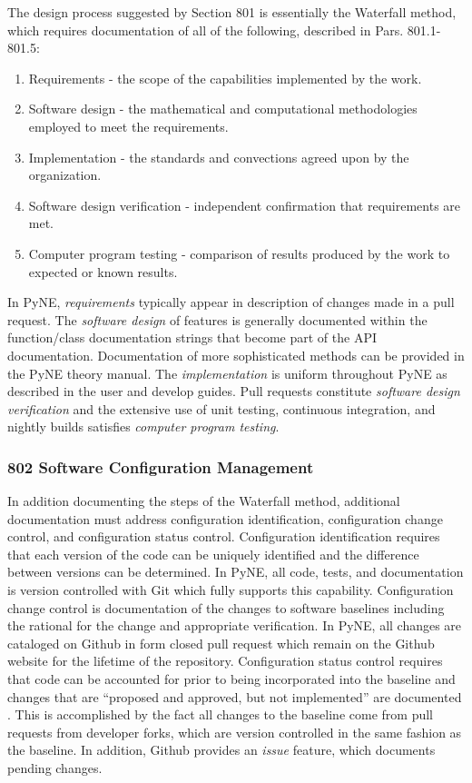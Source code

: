 \documentclass{anstrans}
\begin{document}
The design process suggested by Section 801 is essentially the Waterfall method, which requires documentation of all of the following, described in Pars. 801.1-801.5:

\begin{enumerate} 
\item{Requirements - the scope of the capabilities implemented by the work.}
\item{Software design - the mathematical and computational methodologies employed to meet the requirements.}
\item{Implementation - the standards and convections agreed upon by the organization.}
\item{Software design verification - independent confirmation that requirements are met.}
\item{Computer program testing - comparison of results produced by the work to expected or known results.}
\end{enumerate}

In PyNE, \emph{requirements} typically appear in description of changes made in
a pull request. The \emph{software design} of features is generally documented
within the function/class documentation strings that become part of the API
documentation. Documentation of more sophisticated methods can be provided in the PyNE
theory manual. The \emph{implementation} is uniform throughout PyNE as described
in the user and develop guides. Pull requests constitute \emph{software design
verification} and the extensive use of unit testing, continuous integration, and nightly builds
satisfies \emph{computer program testing}.


\subsubsection{802 Software Configuration Management}

In addition documenting the steps of the Waterfall method, additional
documentation must address configuration identification, configuration change
control, and configuration status control. Configuration identification
requires that each version of the code can be uniquely identified and the
difference between versions can be determined. In PyNE, all code, tests, and
documentation is version controlled with Git which fully supports this
capability. Configuration change control is documentation of the changes to
software baselines including the rational for the change and appropriate
verification. In PyNE, all changes are cataloged on Github in form closed pull
request which remain on the Github website for the lifetime of the repository.
Configuration status control requires that code can be accounted for prior to
being incorporated into the baseline and changes that are ``proposed and approved,
but not implemented'' are documented \cite{add}. This is accomplished by the fact all
changes to the baseline come from pull requests from developer forks, which are
version controlled in the same fashion as the baseline. In addition, Github
provides an \emph{issue} feature, which documents pending changes.
\end{document}

